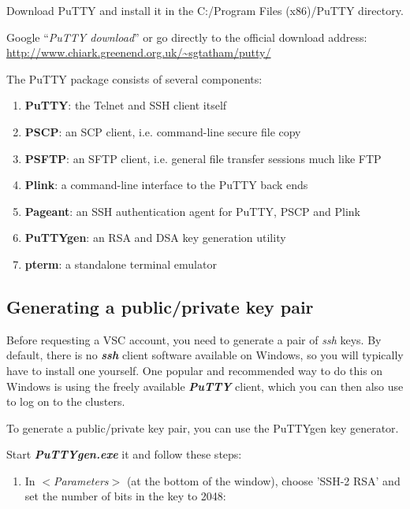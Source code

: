   Download PuTTY and install it in the C:/Program Files (x86)/PuTTY directory.

  Google ``\textit{PuTTY download}'' or go directly to the official download
  address: \url{http://www.chiark.greenend.org.uk/\~sgtatham/putty/}

  The PuTTY package consists of several components:

  \begin{enumerate}
    \item  \textbf{PuTTY}: the Telnet and SSH client itself
    \item  \textbf{PSCP}: an SCP client, i.e. command-line secure file copy
    \item  \textbf{PSFTP}: an SFTP client, i.e. general file transfer sessions much like FTP
    \item  \textbf{Plink}: a command-line interface to the PuTTY back ends
    \item  \textbf{Pageant}: an SSH authentication agent for PuTTY, PSCP and Plink
    \item  \textbf{PuTTYgen}: an RSA and DSA key generation utility
    \item  \textbf{pterm}: a standalone terminal emulator
  \end{enumerate}

  \subsection{Generating a public/private key pair}
  \label{sec:generate-key-pair}

  Before requesting a VSC account, you need to generate a pair of \textit{ssh}
  keys. By default, there is no \textbf{\textit{ssh}} client software available
  on Windows, so you will typically have to install one yourself. One popular and
  recommended way to do this on Windows is using the freely available
  \textbf{\textit{PuTTY}} client, which you can then also use to log on to the
  clusters.

  To generate a public/private key pair, you can use the PuTTYgen key generator.

  Start \textbf{\textit{PuTTYgen.exe}} it and follow these steps:

  \begin{enumerate}
    \item  In $<$\textit{Parameters}$>$ (at the bottom of the window), choose 'SSH-2 RSA' and set the number of bits in the key to 2048:
  \end{enumerate}

